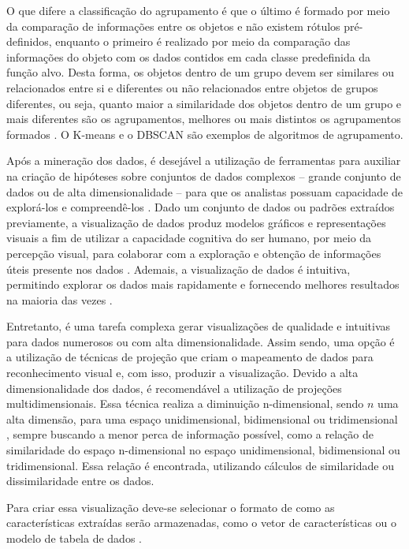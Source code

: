 		O que difere a classificação do agrupamento é que o último é formado por meio da
		comparação de informações entre os objetos e não existem rótulos pré-definidos,
		enquanto o primeiro é realizado por meio da comparação das informações do objeto
		com os dados contidos em cada classe predefinida da função alvo. Desta forma,
		os objetos dentro de um grupo devem ser similares ou relacionados entre si e
		diferentes ou não relacionados entre objetos de grupos diferentes, ou seja,
		quanto maior a similaridade dos objetos dentro de um grupo e mais diferentes
		são os agrupamentos, melhores ou mais distintos os agrupamentos formados \cite{Tan:2005:ch8}.
		O K-means \cite{macqueen1967} e o \ac{DBSCAN} \cite{Ester1996} são exemplos de
		algoritmos de agrupamento.

		Após a mineração dos dados, é desejável a utilização de ferramentas para
		auxiliar na criação de hipóteses sobre conjuntos de dados complexos -- grande
		conjunto de dados ou de alta dimensionalidade -- para que os analistas possuam
		capacidade de explorá-los e compreendê-los \cite{de2003}. Dado um conjunto de
		dados ou padrões extraídos previamente, a visualização de dados
		produz modelos gráficos e representações visuais a fim de utilizar a capacidade
		cognitiva do ser humano, por meio da percepção visual, para colaborar com
		a exploração e obtenção de informações úteis presente nos dados \cite{de2003,keim2002}.
		Ademais, a visualização de dados é intuitiva, permitindo explorar os dados
		mais rapidamente e fornecendo melhores resultados na maioria das vezes \cite{keim2002}.
		
		Entretanto, é uma tarefa complexa gerar visualizações de qualidade e intuitivas para
		dados numerosos ou com alta dimensionalidade. Assim sendo, uma opção é a utilização
		de técnicas de projeção que criam o mapeamento de dados para reconhecimento visual
		\cite{friedman1974} e, com isso, produzir a visualização. Devido a alta dimensionalidade
		dos dados, é recomendável a utilização de projeções multidimensionais. Essa técnica
		realiza a diminuição n-dimensional, sendo $n$ uma alta dimensão, para uma espaço
		unidimensional, bidimensional ou tridimensional \cite{paulovich2008least},
		sempre buscando a menor perca de informação possível, como a relação de
		similaridade do espaço n-dimensional no espaço unidimensional, bidimensional
		ou tridimensional. Essa relação é encontrada, utilizando cálculos de similaridade
		ou dissimilaridade entre os dados.		
		
		Para criar essa visualização deve-se selecionar o formato
		de como as características extraídas serão armazenadas, como o vetor de
		características ou o modelo de tabela de dados \cite{de2003}.
		
